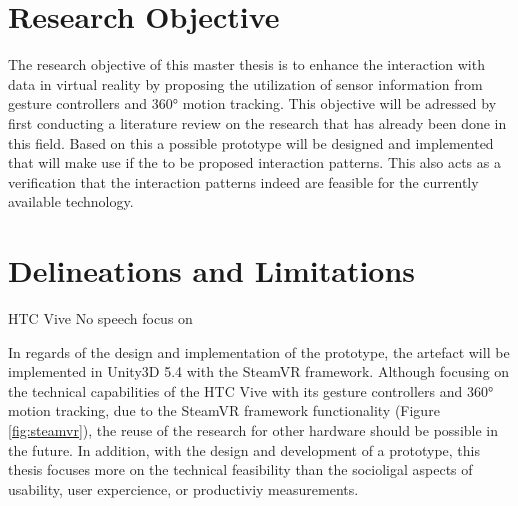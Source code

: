 
\section{Research Objective}

The research objective of this master thesis is to enhance the interaction with data in virtual reality by proposing the utilization of sensor information from gesture controllers and 360° motion tracking.\newline
This objective will be adressed by first conducting a literature review on the research that has already been done in this field. Based on this a possible prototype will be designed and implemented that will make use if the to be proposed interaction patterns. This also acts as a verification that the interaction patterns indeed are feasible for the currently available technology.






\section{Delineations and Limitations}

HTC Vive
No speech
focus on

In regards of the design and implementation of the prototype, the artefact will be implemented in Unity3D 5.4 with the SteamVR framework. Although focusing on the technical capabilities of the HTC Vive with its gesture controllers and 360° motion tracking, due to the SteamVR framework functionality (Figure \ref{fig:steamvr}), the reuse of the research for other hardware should be possible in the future. \newline
In addition, with the design and development of a prototype, this thesis focuses more on the technical feasibility than the socioligal aspects of usability, user expercience, or productiviy measurements. 

